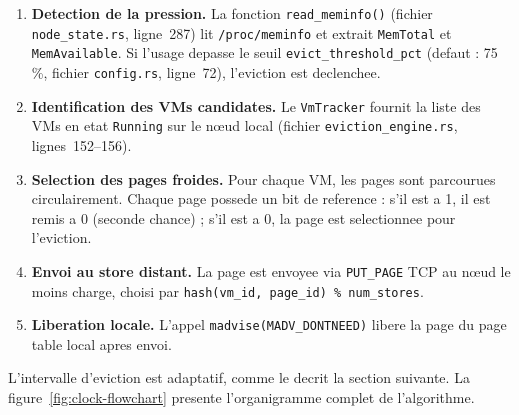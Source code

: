 \begin{enumerate}
    \item \textbf{Detection de la pression.} La fonction \texttt{read\_meminfo()} (fichier \texttt{node\_state.rs}, ligne~287) lit \texttt{/proc/meminfo} et extrait \texttt{MemTotal} et \texttt{MemAvailable}. Si l'usage depasse le seuil \texttt{evict\_threshold\_pct} (defaut : 75\,\%, fichier \texttt{config.rs}, ligne~72), l'eviction est declenchee.
    \item \textbf{Identification des VMs candidates.} Le \texttt{VmTracker} fournit la liste des VMs en etat \texttt{Running} sur le n\oe{}ud local (fichier \texttt{eviction\_engine.rs}, lignes~152--156).
    \item \textbf{Selection des pages froides.} Pour chaque VM, les pages sont parcourues circulairement. Chaque page possede un bit de reference : s'il est a 1, il est remis a 0 (seconde chance) ; s'il est a 0, la page est selectionnee pour l'eviction.
    \item \textbf{Envoi au store distant.} La page est envoyee via \texttt{PUT\_PAGE} TCP au n\oe{}ud le moins charge, choisi par \texttt{hash(vm\_id, page\_id) \% num\_stores}.
    \item \textbf{Liberation locale.} L'appel \texttt{madvise(MADV\_DONTNEED)} libere la page du page table local apres envoi.
\end{enumerate}

L'intervalle d'eviction est adaptatif, comme le decrit la section suivante. La figure~\ref{fig:clock-flowchart} presente l'organigramme complet de l'algorithme.

